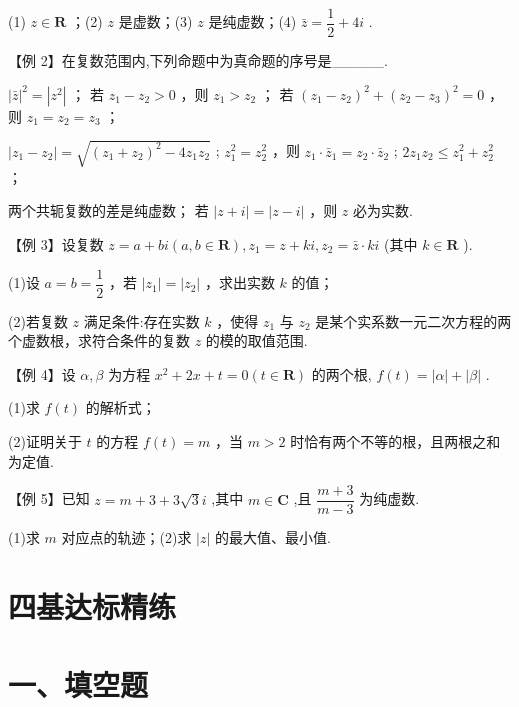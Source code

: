 (1) $z \in  \mathbf{R}$ ；(2) $z$ 是虚数；(3) $z$ 是纯虚数；(4) $\bar{z} = \dfrac{1}{2} + {4i}$ .

【例 2】在复数范围内,下列命题中为真命题的序号是\_\_\_\_\_.

   ${\left| \bar{z}\right| }^{2} = \left| {z}^{2}\right|$ ；   若 ${z}_{1} - {z}_{2} > 0$ ，则 ${z}_{1} > {z}_{2}$ ；   若 ${\left( {z}_{1} - {z}_{2}\right) }^{2} + {\left( {z}_{2} - {z}_{3}\right) }^{2} = 0$ ，则 ${z}_{1} = {z}_{2} = {z}_{3}$ ；

   $\left| {{z}_{1} - {z}_{2}}\right|  = \sqrt{{\left( {z}_{1} + {z}_{2}\right) }^{2} - 4{z}_{1}{z}_{2}}$ ;    ${z}_{1}^{2} = {z}_{2}^{2}$ ，则 ${z}_{1} \cdot  {\bar{z}}_{1} = {z}_{2} \cdot  {\bar{z}}_{2}$ ;    $2{z}_{1}{z}_{2} \leq  {z}_{1}^{2} + {z}_{2}^{2}$ ；

  两个共轭复数的差是纯虚数；  若 $\left| {z + {i}}\right|  = \left| {z - {i}}\right|$ ，则 $z$ 必为实数.

【例 3】设复数 $z = a + b{i}\left( {a,b \in  \mathbf{R}}\right) ,{z}_{1} = z + k{i},{z}_{2} = \bar{z} \cdot  k{i}$ (其中 $k \in  \mathbf{R}$ ).

(1)设 $a = b = \dfrac{1}{2}$ ，若 $\left| {z}_{1}\right|  = \left| {z}_{2}\right|$ ，求出实数 $k$ 的值；

(2)若复数 $z$ 满足条件:存在实数 $k$ ，使得 ${z}_{1}$ 与 ${z}_{2}$ 是某个实系数一元二次方程的两个虚数根，求符合条件的复数 $z$ 的模的取值范围.

【例 4】设 $\alpha ,\beta$ 为方程 ${x}^{2} + {2x} + t = 0\left( {t \in  \mathbf{R}}\right)$ 的两个根, $f\left( t\right)  = \left| \alpha \right|  + \left| \beta \right|$ .

(1)求 $f\left( t\right)$ 的解析式；

(2)证明关于 $t$ 的方程 $f\left( t\right)  = m$ ，当 $m > 2$ 时恰有两个不等的根，且两根之和为定值.

【例 5】已知 $z = m + 3 + 3\sqrt{3}{i}$ ,其中 $m \in  \mathbf{C}$ ,且 $\dfrac{m + 3}{m - 3}$ 为纯虚数.

(1)求 $m$ 对应点的轨迹；(2)求 $\left| z\right|$ 的最大值、最小值.

\section*{四基达标精练}

\section*{一、填空题}

